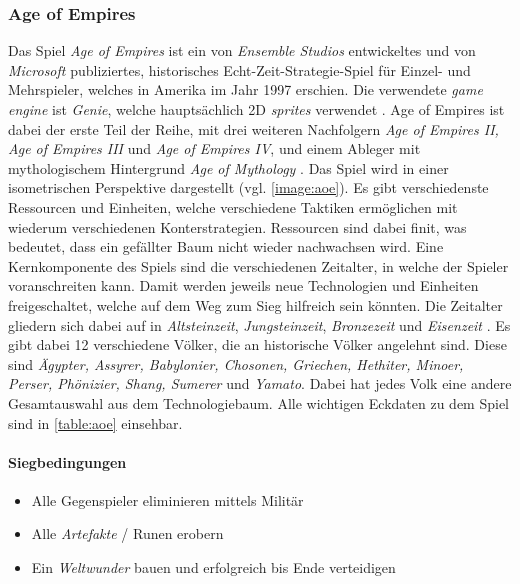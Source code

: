 \subsubsection{Age of Empires}
Das Spiel \textit{Age of Empires} ist ein von \textit{Ensemble Studios} entwickeltes und von \textit{Microsoft} publiziertes, historisches Echt-Zeit-Strategie-Spiel für Einzel- und Mehrspieler, welches in Amerika im Jahr 1997 erschien. Die verwendete \textit{game engine} ist \textit{Genie}, welche hauptsächlich 2D \textit{sprites} verwendet \cite{aoe}. Age of Empires ist dabei der erste Teil der Reihe, mit drei weiteren Nachfolgern \textit{Age of Empires II, Age of Empires III} und \textit{Age of Empires IV}, und einem Ableger mit mythologischem Hintergrund \textit{Age of Mythology} \cite{aoe2}. Das Spiel wird in einer isometrischen Perspektive dargestellt (vgl. \autoref{image:aoe}). Es gibt verschiedenste Ressourcen und Einheiten, welche verschiedene Taktiken ermöglichen mit wiederum verschiedenen Konterstrategien. Ressourcen sind dabei finit, was bedeutet, dass ein gefällter Baum nicht wieder nachwachsen wird. Eine Kernkomponente des Spiels sind die verschiedenen Zeitalter, in welche der Spieler voranschreiten kann. Damit werden jeweils neue Technologien und Einheiten freigeschaltet, welche auf dem Weg zum Sieg hilfreich sein könnten. Die Zeitalter gliedern sich dabei auf in \textit{Altsteinzeit}, \textit{Jungsteinzeit}, \textit{Bronzezeit} und \textit{Eisenzeit} \cite*[]{aoe}. Es gibt dabei 12 verschiedene Völker, die an historische Völker angelehnt sind. Diese sind \textit{Ägypter, Assyrer, Babylonier, Chosonen, Griechen, Hethiter, Minoer, Perser, Phönizier, Shang, Sumerer} und \textit{Yamato}. Dabei hat jedes Volk eine andere Gesamtauswahl aus dem Technologiebaum. Alle wichtigen Eckdaten zu dem Spiel sind in \autoref{table:aoe} einsehbar.
\paragraph*{Siegbedingungen}
\begin{itemize}
    \item Alle Gegenspieler eliminieren mittels Militär
    \item Alle \textit{Artefakte} / Runen erobern
    \item Ein \textit{Weltwunder} bauen und erfolgreich bis Ende verteidigen
\end{itemize}

